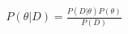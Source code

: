\documentclass[preview]{standalone}
\begin{document}
\begin{align*}
P(\theta|D) = \frac{P(D|\theta) P(\theta)}{P(D)}
\end{align*}
\end{document}
